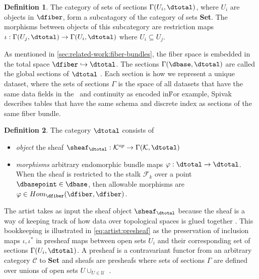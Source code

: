 \documentclass[10pt,journal,compsoc]{IEEEtran}
\theoremstyle{definition}
\newtheorem{definition}{Definition}[section]
\theoremstyle{remark}
\begin{document}
\begin{definition} The category of sets of sections $\Gamma(U_i,\dtotal)$, where $U_i$ are objects in $\mathcal{\dfiber}$, form a subcatagory of the category of sets \textbf{Set}. The morphisms between objects of this subcategory are restriction maps $\iota: \Gamma(U_j, \dtotal) \rightarrow \Gamma(U_i, \dtotal)$ where $U_{i} \subseteq U_{j}$.
\end{definition}

As mentioned in \autoref{sec:related-work:fiber-bundles}, the fiber space is embedded in the total space $\dfiber \hookrightarrow \dtotal$. The sections $\Gamma(\dbase, \dtotal)$ are called the global sections of $\dtotal$ \cite{SheafMathematics2021,spanier1989algebraic}. Each section is how we represent a unique dataset, where the sets of sections $\Gamma$ is the space of all datasets that have the same data fields in the \dfiber\ and continuity as encoded in\dbase\. For example, Spivak describes tables that have the same schema and discrete index as sections of the same fiber bundle\cite{spivakSIMPLICIALDATABASES}.

\begin{definition} The category $\mathcal{\dtotal}$ consists of 
  \begin{itemize}
    \item\textit{object} the sheaf\cite{SheafMathematics2021,ghristElementaryAppliedTopology2014} $\sheaf_{\dtotal}: \mathcal{K}^{op} \rightarrow \Gamma(\mathcal{K}, \dtotal)$
    \item \textit{morphisms} arbitrary endomorphic\cite{fongInvitationAppliedCategory2019} bundle maps $\varphi: \dtotal\rightarrow \dtotal$. When the sheaf is restricted to the stalk\cite{StalkSheaf2019} $\mathscr{F}_{k}$ over a point $\dbasepoint\in \dbase$, then allowable morphisms are $\varphi \in Hom_{\mathcal{\dfiber}}(\dfiber,\dfiber)$. 
  \end{itemize}
\end{definition}

 The artist takes as input the sheaf object $\sheaf_{\dtotal}$ because the sheaf is a way of keeping track of how data over topological spaces is glued together \cite{ghristElementaryAppliedTopology2014}. This bookkeeping is  illustrated in \autoref{eq:artist:presheaf} as the preservation of inclusion maps $\iota, \iota^{*}$ in presheaf maps between open sets $U_i$ and their corresponding set of sections $\Gamma(U_i, \dtotal)$. A presheaf is a contravariant functor from an arbitrary category $\mathcal{C}$ to \textbf{Set} \cite{spanier1989algebraic,SheafMathematics2021,nlab:presheaf} and sheafs are presheafs where sets of sections $\Gamma$ are defined over unions of open sets $U \cup_{U\in \mathscr{U}}$ \cite{spanier1989algebraic, nlab:sheaf}. 
\end{document}
